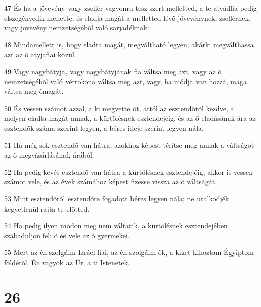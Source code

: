 \par 47 És ha a jövevény vagy zsellér vagyonra tesz szert melletted, a te atyádfia pedig elszegényedik mellette, és eladja magát a melletted lévõ jövevénynek, zsellérnek, vagy jövevény nemzetségébõl való sarjadéknak:
\par 48 Mindamellett is, hogy eladta magát, megváltható legyen; akárki megválthassa azt az õ atyjafiai közül.
\par 49 Vagy nagybátyja, vagy nagybátyjának fia váltsa meg azt, vagy az õ nemzetségébõl való vérrokona váltsa meg azt, vagy, ha módja van hozzá, maga váltsa meg õmagát.
\par 50 És vessen számot azzal, a ki megvette õt, attól az esztendõtõl kezdve, a melyen eladta magát annak, a kürtölésnek esztendejéig, és az õ eladásának ára az esztendõk száma szerint legyen, a béres ideje szerint legyen nála.
\par 51 Ha még sok esztendõ van hátra, azokhoz képest térítse meg annak a váltságot az õ megvásárlásának árából.
\par 52 Ha pedig kevés esztendõ van hátra a kürtölésnek esztendejéig, akkor is vessen számot vele, és az évek számához képest fizesse vissza az õ váltságát.
\par 53 Mint esztendõrõl esztendõre fogadott béres legyen nála; ne uralkodjék kegyetlenül rajta te elõtted.
\par 54 Ha pedig ilyen módon meg nem váltatik, a kürtölésnek esztendejében szabaduljon fel: õ és vele az õ gyermekei.
\par 55 Mert az én szolgáim Izráel fiai, az én szolgáim õk, a kiket kihoztam Égyiptom földérõl. Én vagyok az Úr, a ti Istenetek.

\chapter{26}

